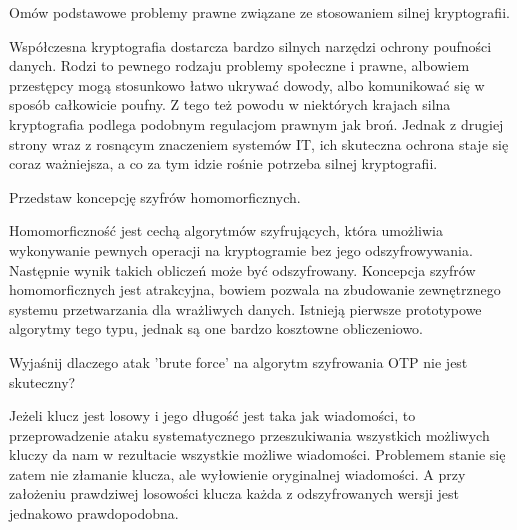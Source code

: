 \documentclass[answers,11pt]{exam}
\begin{document}
\begin{questions}
\question Omów podstawowe problemy prawne związane ze stosowaniem silnej kryptografii.
\begin{solution}
Współczesna kryptografia dostarcza bardzo silnych narzędzi ochrony poufności danych. Rodzi to pewnego rodzaju problemy społeczne i prawne, albowiem przestępcy mogą stosunkowo łatwo ukrywać dowody, albo komunikować się w sposób całkowicie poufny. Z tego też powodu w niektórych krajach silna kryptografia podlega podobnym regulacjom prawnym jak broń. Jednak z drugiej strony wraz z rosnącym znaczeniem systemów IT, ich skuteczna ochrona staje się coraz ważniejsza, a co za tym idzie rośnie potrzeba silnej kryptografii.
\end{solution}

\question Przedstaw koncepcję szyfrów homomorficznych.
\begin{solution}
Homomorficzność jest cechą algorytmów szyfrujących, która umożliwia wykonywanie pewnych operacji na kryptogramie bez jego odszyfrowywania. Następnie wynik takich obliczeń może być  odszyfrowany. Koncepcja szyfrów homomorficznych jest atrakcyjna, bowiem pozwala na zbudowanie zewnętrznego systemu przetwarzania dla wrażliwych danych. Istnieją pierwsze prototypowe algorytmy tego typu, jednak są one bardzo kosztowne obliczeniowo.
\end{solution}

\question Wyjaśnij dlaczego atak 'brute force' na algorytm szyfrowania OTP nie jest skuteczny?
\begin{solution}
Jeżeli klucz jest losowy i jego długość jest taka jak wiadomości, to przeprowadzenie ataku systematycznego przeszukiwania wszystkich możliwych kluczy da nam w rezultacie wszystkie możliwe wiadomości. Problemem stanie się zatem nie złamanie klucza, ale wyłowienie oryginalnej wiadomości. A przy założeniu prawdziwej losowości klucza każda z odszyfrowanych wersji jest jednakowo prawdopodobna.
\end{solution}


\end{questions}
\end{document}
